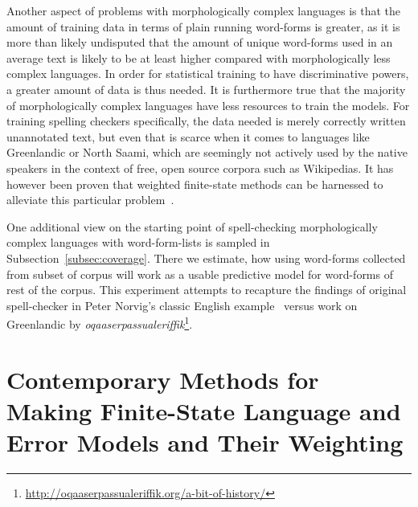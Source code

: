 \documentclass[a4paper,12pt]{article}
\begin{document}
Another aspect of problems with morphologically complex languages is that the
amount of training data in terms of plain running word-forms is greater, as it
is more than likely undisputed that the amount of unique word-forms used in an average text is
likely to be at least higher compared with morphologically less complex languages.
In order for statistical training to have discriminative powers, a greater
amount of data is thus needed. It is furthermore true that the majority of
morphologically complex languages have less resources to train the models. For
training spelling checkers specifically, the data needed is merely correctly
written unannotated text, but even that is scarce when it comes to languages
like Greenlandic or North Saami, which are seemingly not actively used by the
native speakers in the context of free, open source corpora such as Wikipedias.
It has however been proven that weighted finite-state methods can be harnessed
to alleviate this particular problem~\cite[]{pirinen/2010/lrec}.

One additional view on the starting point of spell-checking morphologically
complex languages with word-form-lists is sampled in
Subsection~\ref{subsec:coverage}. There we estimate, how using word-forms
collected from subset of corpus will work as a usable predictive model for
word-forms of rest of the corpus. This experiment attempts to recapture the
findings of original spell-checker in Peter Norvig's classic English
example~\cite[]{norvig/2010} versus work on Greenlandic by
\emph{oqaaserpassualeriffik}\footnote{\url{http://oqaaserpassualeriffik.org/a-bit-of-history/}}.

\section{Contemporary Methods for Making Finite-State Language and Error Models
and Their Weighting}
\label{sec:methods}
\end{document}
